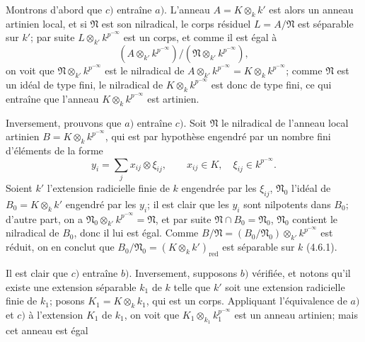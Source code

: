 Montrons d'abord que $c)$ entraîne $a)$. L'anneau $A=K\otimes_k k'$ est alors un anneau artinien local, et si $\mathfrak N$ est son nilradical, le corps résiduel $L=A/\mathfrak N$ est séparable sur $k'$; par suite $L\otimes_{k'}k^{p^{-\infty}}$ est un corps, et comme il est égal à
\[
  (A\otimes_{k'}k^{p^{-\infty}})/(\mathfrak N\otimes_{k'}k^{p^{-\infty}}),
\]
on voit que $\mathfrak N\otimes_{k'}k^{p^{-\infty}}$ est le nilradical de $A\otimes_{k'}k^{p^{-\infty}}=K\otimes_k k^{p^{-\infty}}$; comme $\mathfrak N$ est un idéal de type fini, le nilradical de $K\otimes_k k^{p^{-\infty}}$ est donc de type fini, ce qui entraîne que l'anneau $K\otimes_k k^{p^{-\infty}}$ est artinien.

Inversement, prouvons que $a)$ entraîne $c)$. Soit $\mathfrak N$ le nilradical de l'anneau local artinien $B=K\otimes_k k^{p^{-\infty}}$, qui est par hypothèse engendré par un nombre fini d'éléments de la forme
\[
  y_i=\sum_j x_{ij}\otimes\xi_{ij},\qquad x_{ij}\in K,\quad \xi_{ij}\in k^{p^{-\infty}}.
\]
Soient $k'$ l'extension radicielle finie de $k$ engendrée par les $\xi_{ij}$, $\mathfrak N_0$ l'idéal de $B_0=K\otimes_k k'$ engendré par les $y_i$; il est clair que les $y_i$ sont nilpotents dans $B_0$; d'autre part, on a $\mathfrak N_0\otimes_{k'}k^{p^{-\infty}}=\mathfrak N$, et par suite $\mathfrak N\cap B_0=\mathfrak N_0$, $\mathfrak N_0$ contient le nilradical de $B_0$, donc il lui est égal. Comme $B/\mathfrak N=(B_0/\mathfrak N_0)\otimes_{k'}k^{p^{-\infty}}$ est réduit, on en conclut que $B_0/\mathfrak N_0=(K\otimes_k k')_{\mathrm{red}}$ est séparable sur $k$ (4.6.1).

Il est clair que $c)$ entraîne $b)$. Inversement, supposons $b)$ vérifiée, et notons qu'il existe une extension séparable $k_1$ de $k$ telle que $k'$ soit une extension radicielle finie de $k_1$; posons $K_1=K\otimes_k k_1$, qui est un corps. Appliquant l'équivalence de $a)$ et $c)$ à l'extension $K_1$ de $k_1$, on voit que $K_1\otimes_{k_1}k_1^{p^{-\infty}}$ est un anneau artinien; mais cet anneau est égal

